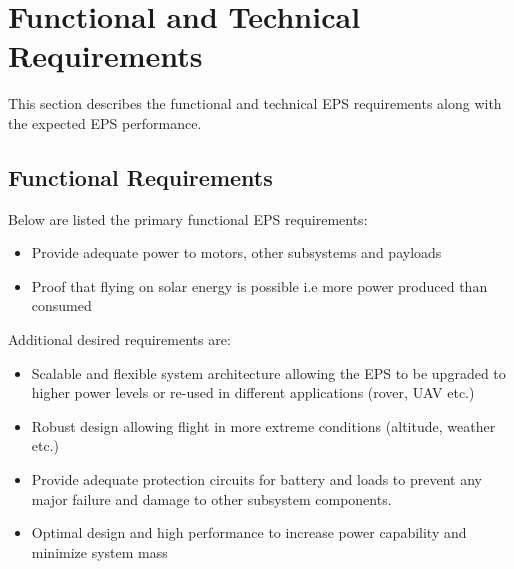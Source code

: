 \newpage
\section{Functional and Technical Requirements}
\label{sec:requirements}
This section describes the functional and technical \ac{EPS} requirements along with the expected \ac{EPS} performance.
%
\subsection{Functional Requirements}
Below are listed the primary functional \ac{EPS} requirements:
%
\begin{itemize}
\item Provide adequate power to motors, other subsystems and payloads
\item Proof that flying on solar energy is possible i.e more power produced than consumed
\end{itemize}
%
Additional desired requirements are:
%
\begin{itemize}
\item Scalable and flexible system architecture allowing the \ac{EPS} to be upgraded to higher power levels or re-used in different applications (rover, \ac{UAV} etc.)
\item Robust design allowing flight in more extreme conditions (altitude, weather etc.)
\item Provide adequate protection circuits for battery and loads to prevent any major failure and damage to other subsystem components.
\item Optimal design and high performance to increase power capability and minimize system mass
\end{itemize}
%
